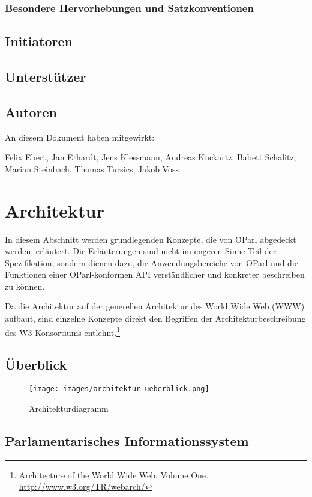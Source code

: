 \documentclass[,a4paper]{article}
\makeatletter
\def\maxwidth{\ifdim\Gin@nat@width>\linewidth\linewidth
\else\Gin@nat@width\fi}
\let\Oldincludegraphics\includegraphics
\renewcommand{\includegraphics}[1]{\Oldincludegraphics[width=\maxwidth]{#1}}
\makeatother
\begin{document}
\subsubsection{Besondere Hervorhebungen und Satzkonventionen}

\subsection{Initiatoren}

\subsection{Unterstützer}

\subsection{Autoren}

An diesem Dokument haben mitgewirkt:

Felix Ebert, Jan Erhardt, Jens Klessmann, Andreas Kuckartz, Babett
Schalitz, Marian Steinbach, Thomas Tursics, Jakob Voss

\section{Architektur}

In diesem Abschnitt werden grundlegenden Konzepte, die von OParl
abgedeckt werden, erläutert. Die Erläuterungen sind nicht im engeren
Sinne Teil der Spezifikation, sondern dienen dazu, die
Anwendungsbereiche von OParl und die Funktionen einer OParl-konformen
API verständlicher und konkreter beschreiben zu können.

Da die Architektur auf der generellen Architektur des World Wide Web
(WWW) aufbaut, sind einzelne Konzepte direkt den Begriffen der
Architekturbeschreibung des W3-Konsortiums entlehnt.\footnote{Architecture
  of the World Wide Web, Volume One. \url{http://www.w3.org/TR/webarch/}}

\subsection{Überblick}

\begin{figure}[htbp]
\centering
\texttt{[image: images/architektur-ueberblick.png]}
\caption{Architekturdiagramm}
\end{figure}

\subsection{Parlamentarisches Informationssystem}
\end{document}
